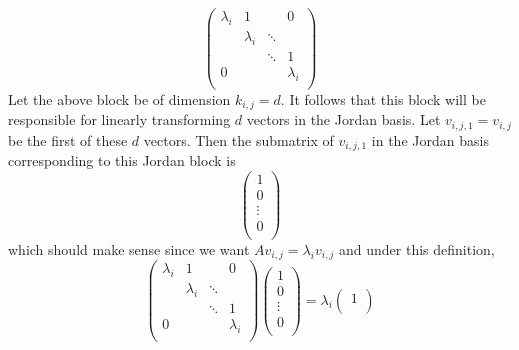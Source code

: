 \documentclass[../notes.tex]{subfiles}
\begin{document}
\begin{itemize}
\begin{enumerate}
\begin{enumerate}
\begin{equation*}
                \begin{pmatrix}
                    \lambda_i & 1 &  & 0\\
                     & \lambda_i & \ddots & \\
                     &  & \ddots & 1\\
                    0 &  &  & \lambda_i\\
                \end{pmatrix}
            \end{equation*}
            Let the above block be of dimension $k_{i,j}=d$. It follows that this block will be responsible for linearly transforming $d$ vectors in the Jordan basis. Let $v_{i,j,1}=v_{i,j}$ be the first of these $d$ vectors. Then the submatrix of $v_{i,j,1}$ in the Jordan basis corresponding to this Jordan block is
            \begin{equation*}
                \begin{pmatrix}
                    1\\
                    0\\
                    \vdots\\
                    0\\
                \end{pmatrix}
            \end{equation*}
            which should make sense since we want $Av_{i,j}=\lambda_iv_{i,j}$ and under this definition,
            \begin{equation*}
                \begin{pmatrix}
                    \lambda_i & 1 &  & 0\\
                     & \lambda_i & \ddots & \\
                     &  & \ddots & 1\\
                    0 &  &  & \lambda_i\\
                \end{pmatrix}
                \begin{pmatrix}
                    1\\
                    0\\
                    \vdots\\
                    0\\
                \end{pmatrix}
                = \lambda_i
                \begin{pmatrix}
                    1\\

\end{pmatrix}
\end{equation*}
\end{enumerate}
\end{enumerate}
\end{itemize}
\end{document}
